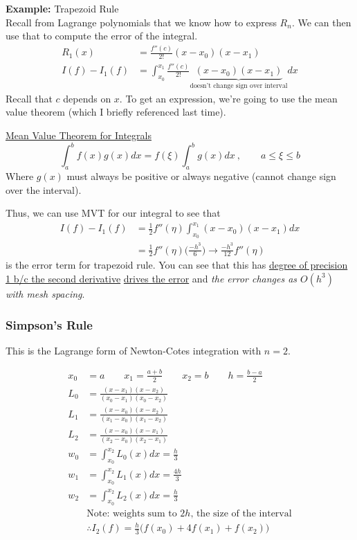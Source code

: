 \documentclass[12pt]{article}
\begin{document}
\textbf{Example:} Trapezoid Rule\\
Recall from Lagrange polynomials that we know how to express $R_n$. We can then use that to compute the error of the integral.
\begin{align*}
R_1(x) &= \frac{f''(c)}{2!}(x-x_0)(x-x_1) \\
I(f) - I_1(f) &= \int_{x_0}^{x_1} \frac{f''(c)}{2!}\underbrace{(x-x_0)(x-x_1)}_{\text{doesn't change sign over interval}} dx
\end{align*}
%
Recall that $c$ depends on $x$. To get an expression, we're going to use the mean value theorem (which I briefly referenced last time).

\underline{Mean Value Theorem for Integrals}\\
\[\int_a^b f(x)g(x)dx = f(\xi) \int_a^b g(x)dx\:, \qquad a\leq \xi \leq b\]
Where $g(x)$ must always be positive or always negative (cannot change sign over the interval).

Thus, we can use MVT for our integral to see that
\begin{align*}
I(f) - I_1(f) &= \frac{1}{2}f''(\eta) \int_{x_0}^{x_1} (x-x_0)(x-x_1) dx \\
&= \frac{1}{2}f''(\eta) \bigl(\frac{-h^3}{6}\bigr) \rightarrow \boxed{\frac{-h^3}{12}f''(\eta)}
\end{align*}
is the error term for trapezoid rule. You can see that this has \underline{degree of precision 1 b/c the second derivative} \underline{drives the error} and \textit{the error changes as $O(h^3)$ with mesh spacing}.


\vspace*{-1em}
\subsubsection*{Simpson's Rule}
This is the Lagrange form of Newton-Cotes integration with $n=2$.

\begin{align*}
x_0 &= a \qquad x_1 = \frac{a+b}{2} \qquad x_2=b \qquad h=\frac{b-a}{2}\\
%
L_0 &= \frac{(x-x_1)(x-x_2)}{(x_0-x_1)(x_0-x_2)}\\
L_1 &= \frac{(x-x_0)(x-x_2)}{(x_1-x_0)(x_1-x_2)}\\
L_2 &= \frac{(x-x_0)(x-x_1)}{(x_2-x_0)(x_2-x_1)}\\
%
w_0 &= \int_{x_0}^{x_2} L_0(x)dx = \frac{h}{3}\\
w_1 &= \int_{x_0}^{x_2} L_1(x)dx = \frac{4h}{3}\\
w_2 &= \int_{x_0}^{x_2} L_2(x)dx = \frac{h}{3}\\
&\text{Note: weights sum to }2h\text{, the size of the interval}\nonumber\\
%
&\therefore I_2(f) = \frac{h}{3}\bigl(f(x_0) + 4f(x_1) + f(x_2)\bigr) 
\end{align*}
 
\end{document}
